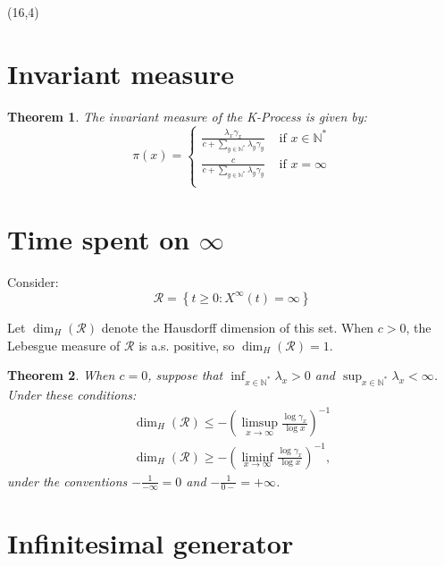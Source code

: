 \documentclass[a1,portrait]{a0poster}
\newtheorem*{teorema}{Theorem}
\newcommand{\RR}{{\mathcal{R}}}
\newcommand{\Nz}{{\mathbb{N^*}}}
\begin{document}
\begin{textblock}{15}(16,4) 
  

  \section{Invariant measure}

  \begin{teorema}
    The invariant measure of the K-Process is given by:
    \begin{displaymath}
      \pi(x) = \begin{cases}
        \frac{\lambda_x \gamma_x}{c + \sum_{y \in \Nz} \lambda_y \gamma_y}
        & \textrm{ if } x \in \Nz \\
        \frac{c}{c + \sum_{y \in \Nz} \lambda_y \gamma_y}
        & \textrm{ if } x = \infty \\
      \end{cases}
    \end{displaymath}
  \end{teorema}

  \section{Time spent on $\infty$}

  Consider:
  \begin{displaymath}
    \RR = \left\{ t \geq 0: X^\infty(t) = \infty \right\}
  \end{displaymath}

  Let $\dim_H(\RR)$ denote the Hausdorff dimension of this set. When
  $c > 0$, the Lebesgue measure of $\RR$ is a.s. positive, so
  $\dim_H(\RR) = 1$.

\begin{teorema}
  \label{cor:log-haus}
  When $c = 0$, suppose that $\inf_{x \in \Nz} \lambda_x > 0$ and $\sup_{x \in \Nz}
  \lambda_x < \infty$. Under these conditions:
  \begin{gather*}
    \dim_H(\RR) \leq
    - \left( \limsup_{x \to \infty} \frac{\log \gamma_x}{\log x}
    \right)^{-1} \\
    \dim_H(\RR) \geq
    - \left( \liminf_{x \to \infty} \frac{\log \gamma_x}{\log x}
    \right)^{-1},
  \end{gather*}
  under the conventions $-\frac{1}{-\infty} = 0$ and $-\frac{1}{0-} =
  +\infty$.
\end{teorema}


\section{Infinitesimal generator}


\end{textblock}
\end{document}
